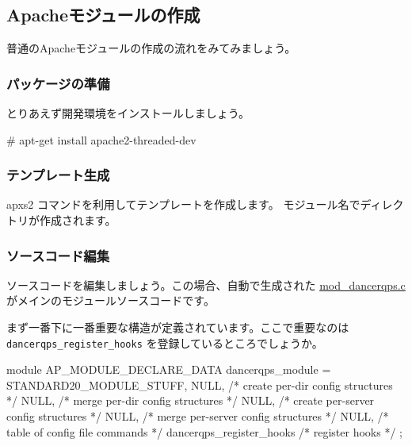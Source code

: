 \documentclass[mingoth,a4paper]{jsarticle}
\begin{document}
\subsection{Apacheモジュールの作成}

普通のApacheモジュールの作成の流れをみてみましょう。

\subsubsection{パッケージの準備}

とりあえず開発環境をインストールしましょう。
\begin{commandline}
# apt-get install apache2-threaded-dev
\end{commandline}

\subsubsection{テンプレート生成}

apxs2 コマンドを利用してテンプレートを作成します。
モジュール名でディレクトリが作成されます。


\subsubsection{ソースコード編集}

ソースコードを編集しましょう。この場合、自動で生成された
\url{mod_dancerqps.c}がメインのモジュールソースコードです。

まず一番下に一番重要な構造が定義されています。ここで重要なのは
\verb!dancerqps_register_hooks! を登録しているところでしょうか。

\begin{commandline}
module AP_MODULE_DECLARE_DATA dancerqps_module = {
    STANDARD20_MODULE_STUFF,
    NULL,                  /* create per-dir    config structures */
    NULL,                  /* merge  per-dir    config structures */
    NULL,                  /* create per-server config structures */
    NULL,                  /* merge  per-server config structures */
    NULL,                  /* table of config file commands       */
    dancerqps_register_hooks  /* register hooks                      */
};
\end{commandline}
\end{document}
